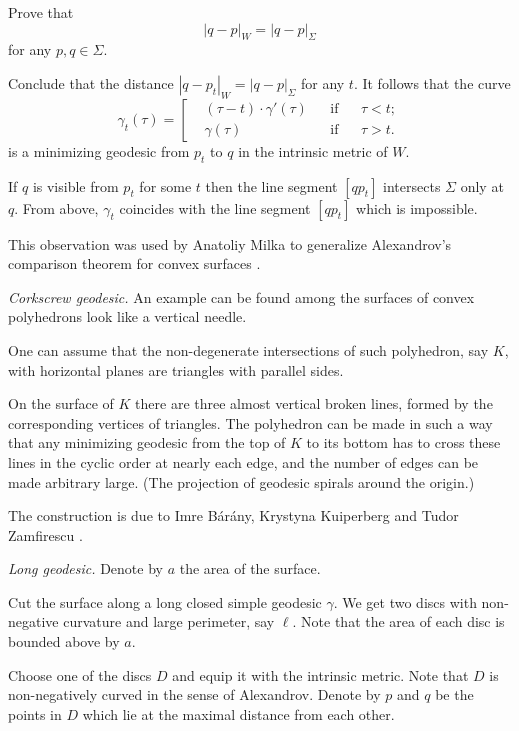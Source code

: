 Prove that 
\[|q - p|_W=|q - p|_\Sigma\] 
for any $p,q\in\Sigma$.


Conclude that the distance $|q - p_t|_W=|q - p|_\Sigma$
for any $t$.
It follows that the curve 
$$\gamma_t(\tau)=\left[
\begin{aligned}
&(\tau-t)\cdot\gamma'(\tau)&&\text{if}&&\tau< t;
\\
&\gamma(\tau)&&\text{if}&&\tau> t.
\end{aligned}
\right.$$
is a minimizing geodesic from $p_t$ to $q$ in the intrinsic metric of $W$. 

If $q$ is visible from $p_t$ for some $t$ then the line segment $[qp_t]$ intersects $\Sigma$ only at $q$.
From above, 
$\gamma_t$  coincides with the line segment $[qp_t]$ which is impossible.

This  observation was used by Anatoliy Milka
to generalize Alexandrov's comparison theorem for convex surfaces \cite[see][]{milka-geod}.

\textit{Corkscrew geodesic.}
An example can be found among the surfaces of convex polyhedrons look like a vertical needle. 

One can assume that 
the non-degenerate intersections of such polyhedron, say $K$,
with horizontal planes are triangles with parallel sides.

On the surface of $K$ there are three almost vertical broken lines, 
formed by the corresponding vertices of triangles.
The polyhedron can be made in such a way that any minimizing geodesic from the top of $K$ to its bottom
has to cross these lines in the cyclic order at nearly each edge, and the number of edges can be made arbitrary large. 
(The projection of geodesic spirals around the origin.)

The construction is due to 
Imre B\'ar\'any, 
Krystyna Kuiperberg 
and Tudor Zamfirescu \cite[see][]{imre-kuiperberg-zamfirescu}.

\textit{Long geodesic.}
Denote by $a$ the area of the surface.

Cut the surface along a long closed simple geodesic $\gamma$.
We get two discs with non-negative curvature and large perimeter, 
say $\ell$.
Note that the area of each disc is bounded above by $a$.

Choose one of the discs $D$ and equip it with the intrinsic metric.
Note that $D$ is non-negatively curved in the sense of Alexandrov.
Denote by $p$ and $q$ be the points in $D$ which lie at the maximal distance from each other.

